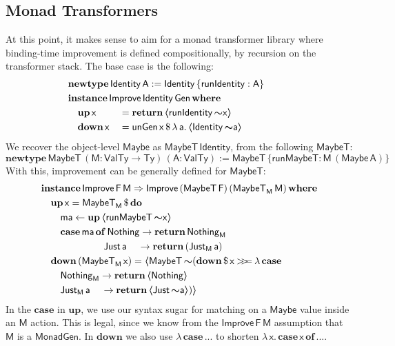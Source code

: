 \documentclass[acmsmall,screen]{acmart}
\newcommand{\mit}[1]{{\mathsf{#1}}}
\newcommand{\msf}[1]{{\mathsf{#1}}}
\newcommand{\mbf}[1]{{\mathbf{#1}}}
\newcommand{\bs}[1]{\boldsymbol{#1}}
\newcommand{\mdo}{\mbf{do}\,}
\newcommand{\ind}{\hspace{1em}}
\newcommand{\return}{\mbf{return}\,}
\newcommand{\lam}{\lambda\,}
\newcommand{\where}{\mbf{where}}
\newcommand{\M}{\msf{M}}
\newcommand{\of}{\mbf{of}\,}
\newcommand{\vma}{\mathsf{ma}}
\newcommand{\vA}{\mathsf{A}}
\newcommand{\vF}{\mathsf{F}}
\newcommand{\vM}{\mathsf{M}}
\newcommand{\va}{\mathsf{a}}
\newcommand{\vx}{\mathsf{x}}
\newcommand{\fro}{\leftarrow}
\newcommand{\case}{\mbf{case\,}}
\newcommand{\spl}{{\bs{\sim}}}
\newcommand{\ql}{{\bs{\langle}}}
\newcommand{\qr}{{\bs{\rangle}}}
\newcommand{\bind}{\mathbin{>\!\!>\mkern-6.7mu=}}
\newcommand{\VTy}{\msf{ValTy}}
\newcommand{\Ty}{\msf{Ty}}
\newcommand{\Maybe}{\msf{Maybe}}
\newcommand{\MaybeT}{\msf{MaybeT}}
\newcommand{\Nothing}{\msf{Nothing}}
\newcommand{\Just}{\msf{Just}}
\theoremstyle{remark}
\newcommand{\mup}{\mbf{up}}
\newcommand{\mdown}{\mbf{down}}
\newcommand{\instance}{\mbf{instance}\,}
\newcommand{\Improve}{\msf{Improve}}
\newcommand{\Gen}{\msf{Gen}}
\newcommand{\unGen}{\mit{unGen}}
\newcommand{\qt}[1]{\ql#1\qr}
\newcommand{\MonadGen}{\msf{MonadGen}}
\newcommand{\RA}{\Rightarrow}
\newcommand{\Identity}{\msf{Identity}}
\newcommand{\runIdentity}{\mit{runIdentity}}
\newcommand{\newtype}{\mbf{newtype}\,}
\newcommand{\runMaybeT}{\mit{runMaybeT}}
\newcommand{\dlr}{\,\$\,}
\begin{document}
\subsection{Monad Transformers}\label{monad-transformers}

At this point, it makes sense to aim for a monad transformer library where
binding-time improvement is defined compositionally, by recursion on the
transformer stack. The base case is the following:
\begin{alignat*}{3}
  & \hspace{-4em}\mathrlap{\newtype \Identity\,\vA := \Identity\,\{\runIdentity : \vA\} }\\
  & \hspace{-4em}\mathrlap{\instance \Improve\,\Identity\,\Gen\,\where}\\
  & \hspace{-4em}\ind \mup\,\vx   &&= \return \qt{\runIdentity\,\spl \vx}\\
  & \hspace{-4em}\ind \mdown\,\vx &&= \unGen\,\vx \dlr \lam \va.\,\qt{\Identity\,\spl \va}
\end{alignat*}
We recover the object-level $\Maybe$ as $\MaybeT\,\Identity$, from the following $\MaybeT$:
\[ \newtype \MaybeT\,(\vM : \VTy \to \Ty)\,(\vA : \VTy) := \MaybeT\,\{\runMaybeT : \vM\,(\Maybe\,\vA)\} \]
With this, improvement can be generally defined for $\MaybeT$:
\begin{alignat*}{3}
  &\instance \Improve\,\vF\,\vM \RA \Improve\,(\MaybeT\,\vF)\,(\MaybeT_\M\,\vM)\,\where\\
  &\ind \mup\,\vx = \MaybeT_\M \dlr \mdo\\
  &\ind\ind \vma \fro \mup\,\qt{\runMaybeT\,\spl \vx}\\
  &\ind\ind \case \vma\,\of \Nothing \to \return \Nothing_\M\\
  &\hspace{6.5em}         \Just\,\va \hspace{1.15em}\to \return (\Just_\M\,\va)\\
  &\ind \mdown\,(\MaybeT_\M\,\vx) = \qt{\MaybeT\,\spl(\mdown \dlr \vx \bind \lam\case\\
  &\ind\ind\Nothing_\M \to \return \qt{\Nothing}\\
  &\ind\ind\Just_\M\,\va\hspace{1.15em} \to \return \qt{\Just\,\spl \va})}
\end{alignat*}
In the $\mbf{case}$ in $\mup$, we use our syntax sugar for matching on a
$\Maybe$ value inside an $\vM$ action. This is legal, since we know from the
$\Improve\,\vF\,\vM$ assumption that $\vM$ is a $\MonadGen$. In $\mdown$ we also use
$\lam\case ...$ to shorten $\lam \vx.\,\case \vx\,\of ...$.
\end{document}
